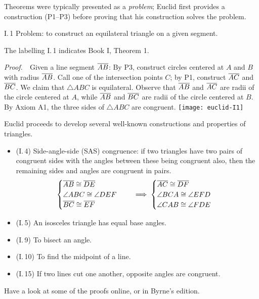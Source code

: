
Theorems were typically presented as a \emph{problem}; Euclid first provides a construction (P1--P3) before proving that his construction solves the problem.

\begin{thm}{I.\,1}{}
	Problem: to construct an equilateral triangle on a given segment.
\end{thm}

The labelling I.\,1 indicates Book I, Theorem 1.

\begin{tcolorbox}[proofstyle, lower separated=false, sidebyside, sidebyside align=top seam, sidebyside gap=0pt, righthand width=0.35\linewidth]
	\emph{Proof.}\ \ Given a line segment $\overline{AB}$:\smallbreak
	By P3, construct circles centered at $A$ and $B$ with radius $\overline{AB}$.\smallbreak
	Call one of the intersection points $C$; by P1, construct $\overline{AC}$ and $\overline{BC}$.\smallbreak
	We claim that $\triangle ABC$ is equilateral.\medbreak
	Observe that $\overline{AB}$ and $\overline{AC}$ are radii of the circle centered at $A$, while $\overline{AB}$ and $\overline{BC}$ are radii of the circle centered at $B$. By Axiom A1, the three sides of $\triangle ABC$ are congruent.
	\tcblower
	\flushright\texttt{[image: euclid-I1]}\hfil\qedsymbol
\end{tcolorbox}


Euclid proceeds to develop several well-known constructions and properties of triangles.
\begin{itemize}\itemsep0pt
  \item (I.\,4) Side-angle-side (SAS) congruence: if two triangles have two pairs of congruent sides with the angles between these being congruent also, then the remaining sides and angles are congruent in pairs.
  \[
  	\begin{cases}
		  \overline{AB}\cong\overline{DE}\\
		  \angle ABC\cong\angle DEF\\
		  \overline{BC}\cong\overline{EF}
 	 	\end{cases}
  	\quad\implies
  	\begin{cases}
		  \overline{AC}\cong\overline{DF}\\
		  \angle BCA\cong\angle EFD\\
		  \angle CAB\cong\angle FDE
  	\end{cases}
  \]
  \item (I.\,5) An isosceles triangle has equal base angles.
  \item (I.\,9) To bisect an angle.
  \item (I.\,10) To find the midpoint of a line.
  \item (I.\,15) If two lines cut one another, opposite angles are congruent.
\end{itemize}
Have a look at some of the proofs online, or in Byrne's edition.

